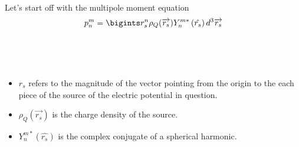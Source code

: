 \documentclass[fleqn]{article}
\begin{document}
\begin{enumerate}
      \textcolor{hwColor}{
        Let's start off with the multipole moment equation 
        $$p^m_n=\bigints r^n_s \rho_Q(\overrightarrow{r_s}) Y^{m*}_n \left(\hat{r_s}\right) d^3 \overrightarrow{r_s}$$ \\
        \\
        \\
        \begin{itemize}
          \item $r_s$ refers to the magnitude of the vector pointing from the origin to the each piece of the source of the
          electric potential in question. 
          \item $\rho_Q(\overrightarrow{r_s})$ is the charge density of the source.
          \item $Y^{m*}_n \left(\hat{r_s}\right)$ is the complex conjugate of a spherical harmonic. 
        \end{itemize}
      }


\end{enumerate}
\end{document}
